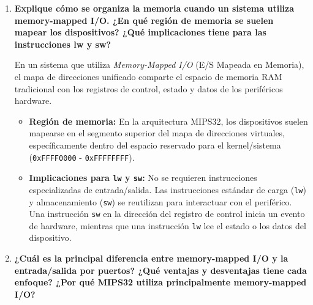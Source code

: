\documentclass[12pt,letterpaper]{article}
\begin{document}
\newpage
{}


\begin{enumerate}

    \item \textbf{\large\color{UCBlue}Explique cómo se organiza la memoria cuando un sistema utiliza memory-mapped I/O. ¿En qué región de memoria se suelen mapear los dispositivos? ¿Qué implicaciones tiene para las instrucciones lw y sw?}
    
    \vspace{0.2cm}
    En un sistema que utiliza \textit{Memory-Mapped I/O} (E/S Mapeada en Memoria), el mapa de direcciones unificado comparte el espacio de memoria RAM tradicional con los registros de control, estado y datos de los periféricos hardware.
    \begin{itemize}
        \item \textbf{Región de memoria:} En la arquitectura MIPS32, los dispositivos suelen mapearse en el segmento superior del mapa de direcciones virtuales, específicamente dentro del espacio reservado para el kernel/sistema (\texttt{0xFFFF0000} - \texttt{0xFFFFFFFF}).
        \item \textbf{Implicaciones para \texttt{lw} y \texttt{sw}:} No se requieren instrucciones especializadas de entrada/salida. Las instrucciones estándar de carga (\texttt{lw}) y almacenamiento (\texttt{sw}) se reutilizan para interactuar con el periférico. Una instrucción \texttt{sw} en la dirección del registro de control inicia un evento de hardware, mientras que una instrucción \texttt{lw} lee el estado o los datos del dispositivo.
    \end{itemize}

    \item \textbf{\large\color{UCBlue}¿Cuál es la principal diferencia entre memory-mapped I/O y la entrada/salida por puertos? ¿Qué ventajas y desventajas tiene cada enfoque? ¿Por qué MIPS32 utiliza principalmente memory-mapped I/O?}
    

\end{enumerate}
\end{document}
